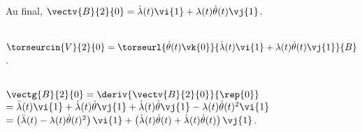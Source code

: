 Au final, $\vectv{B}{2}{0}=\dot{\lambda}(t)\vi{1}+\lambda(t)\dot{\theta}(t)\vj{1}$.

\else
\fi

\ifprof  ~\\
$\torseurcin{V}{2}{0} = \torseurl{\dot{\theta}(t)\vk{0}}{\dot{\lambda}(t)\vi{1}+\lambda(t)\dot{\theta}(t)\vj{1}}{B}$.
\else
\fi

\ifprof  ~\\
$\vectg{B}{2}{0} = \deriv{\vectv{B}{2}{0}}{\rep{0}}$
$ = \ddot{\lambda}(t)\vi{1}+  \dot{\lambda}(t)\dot{\theta}\vj{1}+\dot{\lambda}(t)\dot{\theta}\vj{1}-\lambda(t)\dot{\theta}(t)^2\vi{1}$
$ = \left( \ddot{\lambda}(t)-\lambda(t)\dot{\theta}(t)^2\right)\vi{1}  +  \left( \dot{\lambda}(t)\dot{\theta}(t) +\dot{\lambda}(t)\dot{\theta}(t)\right) \vj{1}$.
\else
\fi

